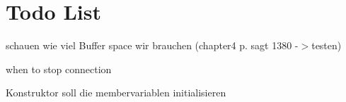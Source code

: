 \chapter{Todo List}
\hypertarget{todo}{}\label{todo}

\begin{DoxyRefList}
\item[Member \doxylink{class_socket_client_ae3962f762b411e9b4bf06be013c3c9f1}{Socket\+Client\+::establish\+Lan\+Connection} ()]\label{todo__todo000044}%
%
schauen wie viel Buffer space wir brauchen (chapter4 p. sagt 1380 -\/\texorpdfstring{$>$}{>}testen) 

\label{todo__todo000045}%
%
when to stop connection  
\item[Member \doxylink{class_socket_client_a8dea390b6a95c2a63848a628fda9b962}{Socket\+Client\+::Socket\+Client} (std\+::string remote\+IPtarget, const unsigned short remote\+Port\+Target)]\label{todo__todo000003}%
%
Konstruktor soll die membervariablen initialisieren 
\end{DoxyRefList}